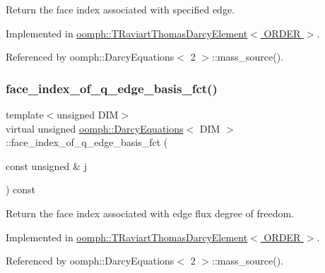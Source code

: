 Return the face index associated with specified edge. 



Implemented in \hyperlink{classoomph_1_1TRaviartThomasDarcyElement_a194a2f0a34700b490e937459a40420d9}{oomph\+::\+T\+Raviart\+Thomas\+Darcy\+Element$<$ O\+R\+D\+E\+R $>$}.



Referenced by oomph\+::\+Darcy\+Equations$<$ 2 $>$\+::mass\+\_\+source().

\mbox{\label{classoomph_1_1DarcyEquations_a7800978eb25207be715250ad446150c5}} 
\subsubsection{\texorpdfstring{face\+\_\+index\+\_\+of\+\_\+q\+\_\+edge\+\_\+basis\+\_\+fct()}{face\_index\_of\_q\_edge\_basis\_fct()}}
{\footnotesize\ttfamily template$<$unsigned D\+IM$>$ \\
virtual unsigned \hyperlink{classoomph_1_1DarcyEquations}{oomph\+::\+Darcy\+Equations}$<$ D\+IM $>$\+::face\+\_\+index\+\_\+of\+\_\+q\+\_\+edge\+\_\+basis\+\_\+fct (\begin{DoxyParamCaption}\item[{const unsigned \&}]{j }\end{DoxyParamCaption}) const\hspace{0.3cm}{\ttfamily [pure virtual]}}



Return the face index associated with edge flux degree of freedom. 



Implemented in \hyperlink{classoomph_1_1TRaviartThomasDarcyElement_a7abc470b07eb3e492b4aed3555734548}{oomph\+::\+T\+Raviart\+Thomas\+Darcy\+Element$<$ O\+R\+D\+E\+R $>$}.



Referenced by oomph\+::\+Darcy\+Equations$<$ 2 $>$\+::mass\+\_\+source().

\mbox{\label{classoomph_1_1DarcyEquations_a7597d6d7e22f97fd2a6f4ab811dd2b72}} 

